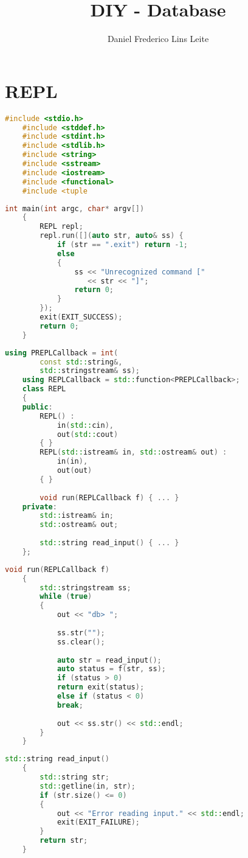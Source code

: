 \documentclass[10pt,a4paper]{book}
\author{Daniel Frederico Lins Leite}
\title{DIY - Database}
\begin{document}
	\chapter{REPL}
	
	\begin{lstlisting}[language=C++, caption={C++ code using listings}]
	#include <stdio.h>
	#include <stddef.h>
	#include <stdint.h>
	#include <stdlib.h>
	#include <string>
	#include <sstream>
	#include <iostream>
	#include <functional>
	#include <tuple
	\end{lstlisting}
	
	\begin{lstlisting}[language=C++, caption={C++ code using listings}]
	int main(int argc, char* argv[]) 
	{
		REPL repl;
		repl.run([](auto str, auto& ss) {
			if (str == ".exit") return -1;
			else 
			{
				ss << "Unrecognized command [" 
				   << str << "]";
				return 0;
			}
		});
		exit(EXIT_SUCCESS);
		return 0;
	}
	\end{lstlisting}
	
	\pagebreak
	
	\begin{lstlisting}[language=C++, caption={C++ code using listings}]
	using PREPLCallback = int(
		const std::string&,
		std::stringstream& ss);
	using REPLCallback = std::function<PREPLCallback>;
	class REPL
	{
	public:
		REPL() :
			in(std::cin),
			out(std::cout)
		{ }
		REPL(std::istream& in, std::ostream& out) :
			in(in),
			out(out)
		{ }
		
		void run(REPLCallback f) { ... }
	private:
		std::istream& in;
		std::ostream& out;
		
		std::string read_input() { ... }	
	};
	\end{lstlisting}
	
	\begin{lstlisting}[language=C++, caption={C++ code using listings}]
	void run(REPLCallback f)
	{
		std::stringstream ss;
		while (true) 
		{
			out << "db> ";
			
			ss.str("");
			ss.clear();
			
			auto str = read_input();
			auto status = f(str, ss);
			if (status > 0)
			return exit(status);
			else if (status < 0)
			break;
			
			out << ss.str() << std::endl;
		}
	}
	\end{lstlisting}
	
	\begin{lstlisting}[language=C++, caption={C++ code using listings}]
	std::string read_input() 
	{
		std::string str;
		std::getline(in, str);
		if (str.size() <= 0)
		{
			out << "Error reading input." << std::endl;
			exit(EXIT_FAILURE);
		}
		return str;
	}
	\end{lstlisting}
\end{document}
